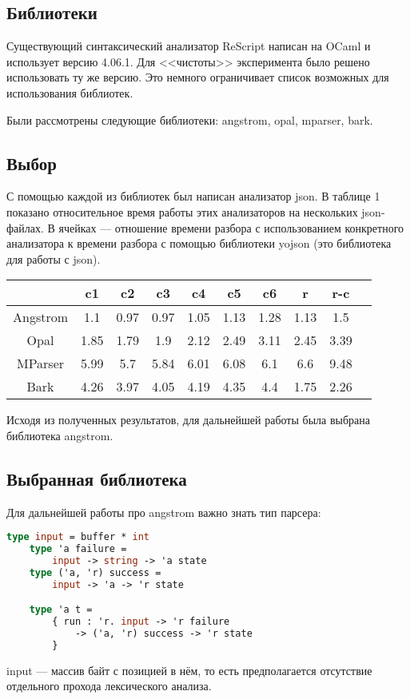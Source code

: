 \subsection{Библиотеки}

Существующий синтаксический анализатор ReScript написан на OCaml и использует версию 4.06.1.
Для <<чистоты>> эксперимента было решено использовать ту же версию.
Это немного ограничивает список возможных для использования библиотек.

Были рассмотрены следующие библиотеки: angstrom, opal, mparser, bark.

\subsection{Выбор}

С помощью каждой из библиотек был написан анализатор json.
В таблице 1 показано относительное время работы этих анализаторов на нескольких json-файлах.
В ячейках --- отношение времени разбора с использованием конкретного анализатора
к времени разбора с помощью библиотеки yojson (это библиотека для работы с json).

\noindent
\begin{center}
    \begin{tabular}{|c|c|c|c|c|c|c|c|c|c|}
        \hline
                           & c1   & c2   & c3   & c4   & c5   & c6   & r    & r-c
        \\\hline
           Angstrom        & 1.1  & 0.97 & 0.97 & 1.05 & 1.13 & 1.28 & 1.13 & 1.5
        \\ Opal            & 1.85 & 1.79 & 1.9  & 2.12 & 2.49 & 3.11 & 2.45 & 3.39
        \\ MParser         & 5.99 & 5.7  & 5.84 & 6.01 & 6.08 & 6.1  & 6.6  & 9.48
        \\ Bark            & 4.26 & 3.97 & 4.05 & 4.19 & 4.35 & 4.4  & 1.75 & 2.26
        \\\hline
    \end{tabular}
\end{center}

Исходя из полученных результатов, для дальнейшей работы была выбрана библиотека angstrom.

\newpage
\subsection{Выбранная библиотека}

Для дальнейшей работы про angstrom важно знать тип парсера:

\begin{lstlisting}[escapechar=!,language=Caml]
    type input = buffer * int
    type 'a failure =
        input -> string -> 'a state
    type ('a, 'r) success =
        input -> 'a -> 'r state

    type 'a t =
        { run : 'r. input -> 'r failure
            -> ('a, 'r) success -> 'r state
        }
\end{lstlisting}

input --- массив байт с позицией в нём,
то есть предполагается отсутствие отдельного прохода лексического анализа.
